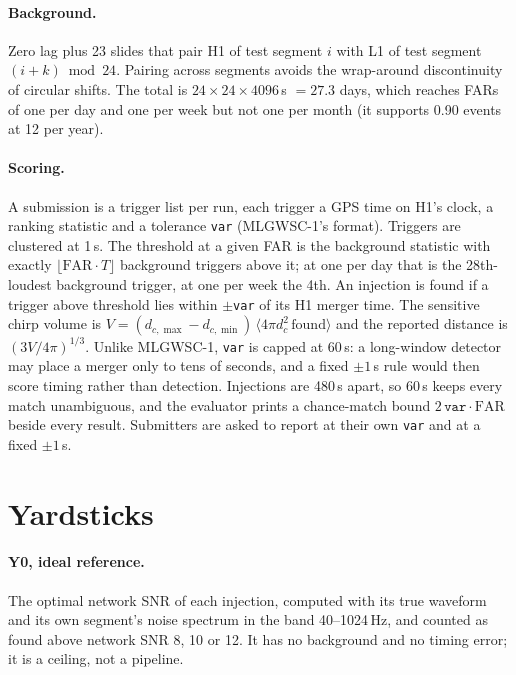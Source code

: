 \documentclass[11pt]{article}
\begin{document}
\paragraph{Background.} Zero lag plus 23 slides that pair H1 of test segment $i$ with L1 of test segment
$(i+k) \bmod 24$. Pairing across segments avoids the wrap-around discontinuity of circular shifts. The total is
$24 \times 24 \times 4096$\,s $= 27.3$ days, which reaches FARs of one per day and one per week but not one per
month (it supports 0.90 events at 12 per year).

\paragraph{Scoring.} A submission is a trigger list per run, each trigger a GPS time on H1's clock, a ranking
statistic and a tolerance \texttt{var} (MLGWSC-1's format). Triggers are clustered at 1\,s. The threshold at a given
FAR is the background statistic with exactly $\lfloor \mathrm{FAR}\cdot T \rfloor$ background triggers above it; at one
per day that is the 28th-loudest background trigger, at one per week the 4th. An injection is found if a trigger
above threshold lies within $\pm$\texttt{var} of its H1 merger time. The sensitive chirp volume is
$V = (d_{c,\max} - d_{c,\min})\,\langle 4\pi d_c^2\, \mathrm{found} \rangle$ and the reported distance is
$(3V/4\pi)^{1/3}$. Unlike MLGWSC-1, \texttt{var} is capped at 60\,s: a long-window detector may place a merger only to
tens of seconds, and a fixed $\pm1$\,s rule would then score timing rather than detection. Injections are 480\,s
apart, so 60\,s keeps every match unambiguous, and the evaluator prints a chance-match bound $2\,\mathtt{var}\cdot
\mathrm{FAR}$ beside every result. Submitters are asked to report at their own \texttt{var} and at a fixed
$\pm1$\,s.

\section{Yardsticks}
\paragraph{Y0, ideal reference.} The optimal network SNR of each injection, computed with its true waveform and its
own segment's noise spectrum in the band 40--1024\,Hz, and counted as found above network SNR 8, 10 or 12. It has no
background and no timing error; it is a ceiling, not a pipeline.
\end{document}
